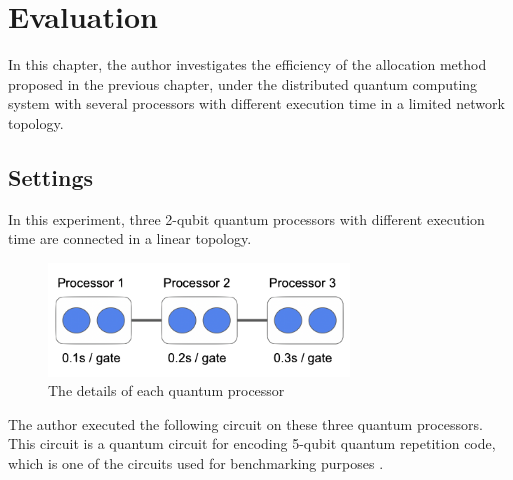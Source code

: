 \chapter{Evaluation}

 In this chapter, the author investigates the efficiency of the allocation method proposed in the previous chapter, under the distributed quantum computing system with several processors with different execution time in a limited network topology.  
 
\section{Settings}
In this experiment, three 2-qubit quantum processors with different execution time are connected in a linear topology.
 
 \begin{figure}[ht]
  		\begin{center}
  			\includegraphics[width=8cm]{img/first_experiment.png}
			\caption{The details of each quantum processor}
		\end{center}
	\end{figure}
 
 The author executed the following circuit on these three quantum processors.  This circuit is a quantum circuit for encoding 5-qubit quantum repetition code, which is one of the circuits used for benchmarking purposes \cite{qasmbench}.
 
  \begin{figure}[ht]
  	\begin{center}
	\end{center}
\end{figure}

